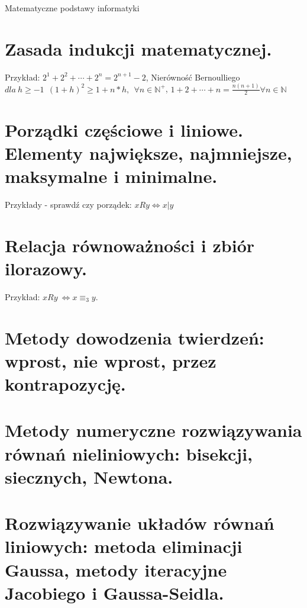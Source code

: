 \documentclass[12pt]{article}
\begin{document}
    \tableofcontents

    \newpage


    \begin{center}{\LARGE Matematyczne podstawy informatyki}\end{center}

    \section{Zasada indukcji matematycznej.}

    Przykład: $2^1 + 2^2 + \cdots + 2^n = 2^{n+1} - 2$, Nierówność Bernoulliego
    $dla ~ h \geq -1 ~~ (1+h)^2 \geq 1 + n*h, ~~ \forall n \in \mathbb{N}^{+}$, $1 + 2 + \cdots + n = \frac{n(n+1)}{2} \forall n \in \mathbb{N}$

    \newpage

    \section{Porządki częściowe i liniowe. Elementy największe, najmniejsze, maksymalne i minimalne.}

    Przykłady - sprawdź czy porządek: $xRy \Leftrightarrow x | y$

    \newpage

    \section{Relacja równoważności i zbiór ilorazowy.}

    Przykład: $xRy ~ \Leftrightarrow x \equiv_3 y$.

    \newpage

    \section{Metody dowodzenia twierdzeń: wprost, nie wprost, przez kontrapozycję.}

    \newpage

    \section{Metody numeryczne rozwiązywania równań nieliniowych: bisekcji, siecznych, Newtona.}

    \newpage

    \section{Rozwiązywanie układów równań liniowych: metoda eliminacji Gaussa, metody iteracyjne Jacobiego i Gaussa-Seidla.}
\end{document}
